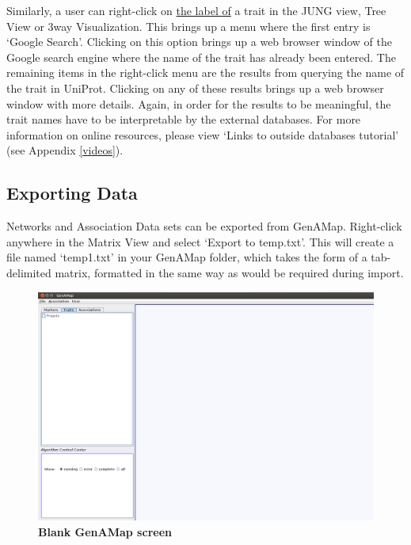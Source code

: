\documentclass{article}
\begin{document}
Similarly, a user can right-click on \underline{the label of} a trait in the JUNG view, Tree View or 3way Visualization. This brings up a menu where the first entry is `Google Search'. Clicking on this option brings up a web browser window of the Google search engine where the name of the trait has already been entered. The remaining items in the right-click menu are the results from querying the name of the trait in UniProt. Clicking on any of these results brings up a web browser window with more details. Again, in order for the results to be meaningful, the trait names have to be interpretable by the external databases. For more information on online resources, please view `Links to outside databases tutorial' (see Appendix \ref{videos}).

\subsection{Exporting Data}

Networks and Association Data sets can be exported from GenAMap. Right-click anywhere in the Matrix View and select `Export to temp.txt'. This will create a file named `temp1.txt' in your GenAMap folder, which takes the form of a tab-delimited matrix, formatted in the same way as would be required during import.


\pagebreak

\begin{figure}
\includegraphics[width=\textwidth]{blank.png}
\caption{\textbf{Blank GenAMap screen}}
\label{blank}
\end{figure}
\end{document}
